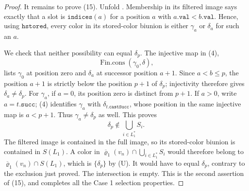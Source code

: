 \begin{proof}
It remains to prove (15).  Unfold
.  Membership in its filtered image
says exactly that a slot is \(\mathtt{indices}(a)\) for a position
\(a\) with \(a.\mathtt{val}<b.\mathtt{val}\).  Hence, using
\(\mathtt{hstored}\), every color in its stored-color biunion is either
\(\gamma_a\) or \(\delta_a\) for such an \(a\).

We check that neither possibility can equal \(\delta_p\).  The injective
map in (4),
\[
 \operatorname{Fin.cons}(\gamma_0,\delta),
\]
lists \(\gamma_0\) at position zero and \(\delta_a\) at successor
position \(a+1\).  Since \(a<b\leq p\), the position \(a+1\) is strictly
below the position \(p+1\) of \(\delta_p\); injectivity therefore gives
\(\delta_a\ne\delta_p\).  For \(\gamma_a\), if \(a=0\), its position
zero is distinct from \(p+1\).  If \(a>0\), write
\(a=t.\mathtt{succ}\); (4) identifies \(\gamma_a\) with
\(\delta_{t.\mathtt{castSucc}}\), whose position in the same injective
map is \(a<p+1\).  Thus \(\gamma_a\ne\delta_p\) as well.  This proves
\[
          \delta_p\notin\bigcup_{i\in L_1^*}S_i.
\]
The filtered image is contained in the full image, so its stored-color
biunion is contained in \(S(L_1)\).  A color in
\(\overline\varrho_1(v_n)\cap\bigcup_{i\in L_1^*}S_i\) would therefore
belong to \(\overline\varrho_1(v_n)\cap S(L_1)\), which is
\(\{\delta_p\}\) by (U).  It would have to equal \(\delta_p\), contrary
to the exclusion just proved.  The intersection is empty.  This is the
second assertion of (15), and completes all the Case 1 selection
properties.
\end{proof}
